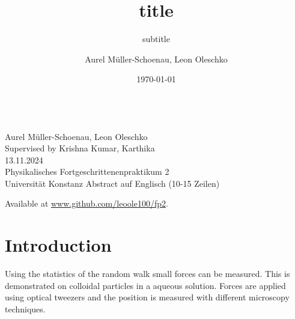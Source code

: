 \documentclass[
    twoside=false,
    twocolumn=true,
    fontsize=11pt,
]{scrarticle}
\begin{document}
\title{title}
\subtitle{subtitle}
\author{Aurel Müller-Schoenau, Leon Oleschko}
\date{\dotdate\today}


\begin{titlepage}
    \sffamily
    \vspace*{3cm}
    {
        \fontsize{32}{32}
    }
    \vspace{.25cm}\\
    {
        \Large
        Aurel Müller-Schoenau, Leon Oleschko\\
        Supervised by Krishna Kumar, Karthika
        \vspace{.05cm}\\
        13.11.2024
        \vspace{.25cm}\\
        \normalsize
        Physikalisches Fortgeschrittenenpraktikum 2\\
        Universität Konstanz
    }
    \vfill
    {
        \normalfont\normalsize
        Abstract auf Englisch (10-15 Zeilen)
        \blindtext[2]
    }
    \vfill
    \begin{flushright}
        Available at \url{www.github.com/leoole100/fp2}.
    \end{flushright}
\end{titlepage}

\section{Introduction}
Using the statistics of the random walk small forces can be measured.
This is demonstrated on colloidal particles in a aqueous solution.
Forces are applied using optical tweezers and the position is measured with different microscopy techniques.


\end{document}
